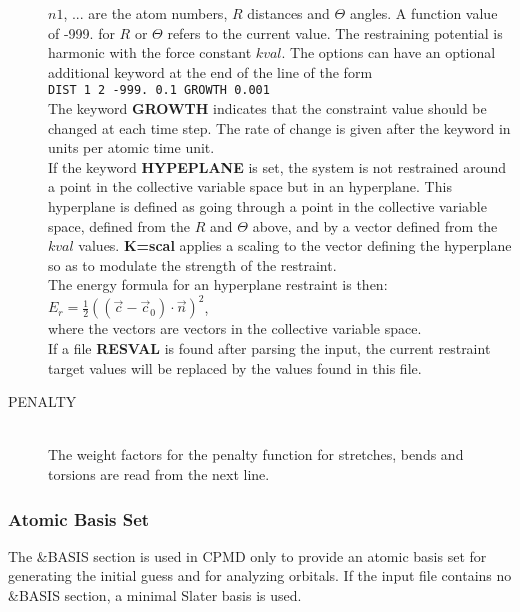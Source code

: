 \documentclass[twoside,10pt,titlepage,a4paper]{article}
\begin{document}
\begin{description}
             $n1$, ... are the atom numbers, $R$ distances and $\Theta$ angles. A
             function value of -999. for $R$ or $\Theta$ refers to the current value.
             The restraining potential is harmonic with the force constant $kval$.
             The options can have an optional additional keyword at the
             end of the line of the form \\
             {\tt DIST  1 2 -999. 0.1  GROWTH  0.001 }\\
             The keyword {\bf GROWTH} indicates that the constraint value should be
             changed at each time step. The rate of change is given after the keyword
             in units per atomic time unit.\\
             If the keyword {\bf HYPEPLANE} is set, the system is not restrained around 
             a point in the collective variable space but in an hyperplane. This 
             hyperplane is defined as going through a point in the collective variable 
             space, defined from the $R$ and $\Theta$ above, and by a vector defined 
             from the $kval$ values. {\bf K=scal} applies a scaling to the vector 
             defining the hyperplane so as to modulate the strength of the restraint.\\
             The energy formula for an hyperplane restraint is then:\\
             $E_r=\frac{1}{2}\left((\vec{c}-\vec{c}_0)\cdot \vec{n}\right)^2$,\\
             where the vectors are vectors in the collective variable space.\\
             If a file {\bf RESVAL} is found after parsing the input, the current 
             restraint target values will be replaced by the values found in this file.
        \item[PENALTY]\hfill \\
             The weight factors for the penalty function
             for stretches, bends and torsions are read from the
             next line.
           \end{description}


\subsubsection{Atomic Basis Set}
\label{input:basis}

The \&BASIS section is used in CPMD only to provide an atomic basis set
for generating the initial guess and for analyzing orbitals. If the
input file contains no \&BASIS section, a minimal Slater basis is used.\\
\end{document}
